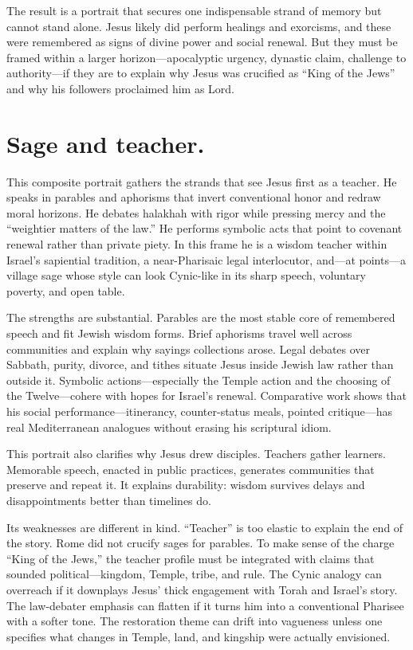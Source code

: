 The result is a portrait that secures one indispensable strand of memory but cannot stand alone.
Jesus likely did perform healings and exorcisms, and these were remembered as signs of divine power and social renewal.
But they must be framed within a larger horizon—apocalyptic urgency, dynastic claim, challenge to authority—if they are to explain why Jesus was crucified as “King of the Jews” and why his followers proclaimed him as Lord.

\section{Sage and teacher.}

This composite portrait gathers the strands that see Jesus first as a teacher.
He speaks in parables and aphorisms that invert conventional honor and redraw moral horizons.
He debates halakhah with rigor while pressing mercy and the “weightier matters of the law.”
He performs symbolic acts that point to covenant renewal rather than private piety.
In this frame he is a wisdom teacher within Israel’s sapiential tradition, a near-Pharisaic legal interlocutor, and—at points—a village sage whose style can look Cynic-like in its sharp speech, voluntary poverty, and open table.

The strengths are substantial.
Parables are the most stable core of remembered speech and fit Jewish wisdom forms.
Brief aphorisms travel well across communities and explain why sayings collections arose.
Legal debates over Sabbath, purity, divorce, and tithes situate Jesus inside Jewish law rather than outside it.
Symbolic actions—especially the Temple action and the choosing of the Twelve—cohere with hopes for Israel’s renewal.
Comparative work shows that his social performance—itinerancy, counter-status meals, pointed critique—has real Mediterranean analogues without erasing his scriptural idiom.

This portrait also clarifies why Jesus drew disciples.
Teachers gather learners.
Memorable speech, enacted in public practices, generates communities that preserve and repeat it.
It explains durability: wisdom survives delays and disappointments better than timelines do.

Its weaknesses are different in kind.
“Teacher” is too elastic to explain the end of the story.
Rome did not crucify sages for parables.
To make sense of the charge “King of the Jews,” the teacher profile must be integrated with claims that sounded political—kingdom, Temple, tribe, and rule.
The Cynic analogy can overreach if it downplays Jesus’ thick engagement with Torah and Israel’s story.
The law-debater emphasis can flatten if it turns him into a conventional Pharisee with a softer tone.
The restoration theme can drift into vagueness unless one specifies what changes in Temple, land, and kingship were actually envisioned.

